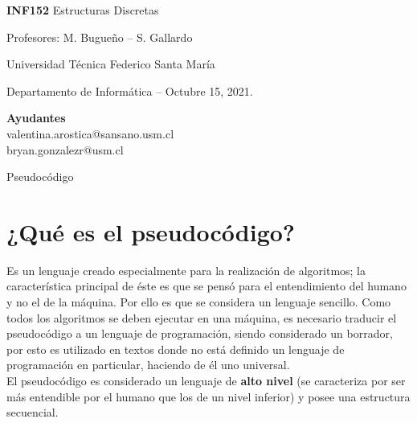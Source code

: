 \documentclass[letterpaper,12pt]{article}
\begin{document}
\begin{minipage}[t]{0.6\textwidth}
{\Large \textbf{INF152} Estructuras Discretas}

{\large Profesores: M. Bugueño -- S. Gallardo}

Universidad Técnica Federico Santa María

Departamento de Inform\'atica -- Octubre 15, 2021.

\end{minipage}
\hfill
\begin{minipage}[t]{0.35\textwidth}
\textbf{Ayudantes}\\
valentina.arostica@sansano.usm.cl\\
bryan.gonzalezr@usm.cl
\end{minipage}

\vspace{0.8cm}

\begin{center}
    \Huge{Pseudocódigo}
\end{center}



\vspace{0.4cm} 


\section{¿Qué es el pseudocódigo?}
Es un lenguaje creado especialmente para la realización de algoritmos; la característica
principal de éste es que se pensó para el entendimiento del humano y no el de la máquina.
Por ello es que se considera un lenguaje sencillo. Como todos los algoritmos se deben
ejecutar en una máquina, es necesario traducir el pseudocódigo a un lenguaje de
programación, siendo considerado un borrador, por esto es utilizado en textos donde no está
definido un lenguaje de programación en particular, haciendo de él uno universal.\\

El pseudocódigo es considerado un lenguaje de \textbf{alto nivel} (se caracteriza por
ser más entendible por el humano que los de un nivel inferior) y posee una estructura
secuencial.
\end{document}
